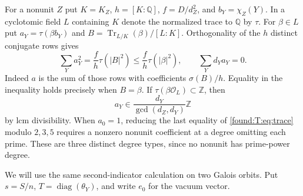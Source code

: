\documentclass[11pt,a4paper]{article}
\numberwithin{equation}{section}
\theoremstyle{remark}
\newcommand{\ZZ}{\mathbb Z}
\newcommand{\QQ}{\mathbb Q}
\newcommand{\Tr}{\operatorname{Tr}}
\begin{document}
For a nonunit $Z$ put $K=K_Z$, $h=[K:\QQ]$, $f=D/d_Z^2$, and $b_Y=\chi_Z(Y)$. In a cyclotomic field $L$ containing $K$ denote the normalized trace to $\QQ$ by $\tau$. For $\beta\in L$ put $a_Y=\tau(\beta b_Y)$ and $B=\Tr_{L/K}(\beta)/[L:K]$. Orthogonality of the $h$ distinct conjugate rows gives
\begin{equation}\label{found:T:eq:trace}
 \sum_Y a_Y^2=\frac{f}{h}\tau(|B|^2)\le\frac{f}{h}\tau(|\beta|^2),
 \qquad \sum_Y d_Ya_Y=0.                                    
\end{equation}
Indeed $a$ is the sum of those rows with coefficients $\sigma(B)/h$. Equality in the inequality holds precisely when $B=\beta$. If $\tau(\beta\mathcal O_L)\subset\ZZ$, then
\[
 a_Y\in\frac{d_Y}{\gcd(d_Z,d_Y)}\ZZ
\]
by lcm divisibility. When $a_0=1$, reducing the last equality of \eqref{found:T:eq:trace} modulo $2,3,5$ requires a nonzero nonunit coefficient at a degree omitting each prime. These are three distinct degree types, since no nonunit has prime-power degree.


We will use the same second-indicator calculation on two Galois orbits. Put $s=S/n$, $T=\operatorname{diag}(\theta_Y)$, and write $e_0$ for the vacuum vector.
\end{document}
